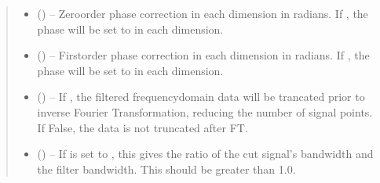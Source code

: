 \documentclass[letterpaper,10pt,english]{sphinxmanual}
\begin{document}
\begin{fulllineitems}
\begin{quote}
\begin{description}
\begin{itemize}
\item {} 
\sphinxAtStartPar
{} (\sphinxstyleliteralemphasis{\sphinxupquote{{[}}}\sphinxstyleliteralemphasis{\sphinxupquote{{]}}}\sphinxstyleliteralemphasis{\sphinxupquote{, }}\sphinxstyleliteralemphasis{\sphinxupquote{{[}}}\sphinxstyleliteralemphasis{\sphinxupquote{, }}\sphinxstyleliteralemphasis{\sphinxupquote{{]}}}) – Zero\sphinxhyphen{}order phase correction in each dimension in radians. If ,
the phase will be set to  in each dimension.

\item {} 
\sphinxAtStartPar
{} (\sphinxstyleliteralemphasis{\sphinxupquote{{[}}}\sphinxstyleliteralemphasis{\sphinxupquote{{]} or }}\sphinxstyleliteralemphasis{\sphinxupquote{{[}}}\sphinxstyleliteralemphasis{\sphinxupquote{, }}\sphinxstyleliteralemphasis{\sphinxupquote{{]}}}\sphinxstyleliteralemphasis{\sphinxupquote{, }}\sphinxstyleliteralemphasis{\sphinxupquote{ {[}}}\sphinxstyleliteralemphasis{\sphinxupquote{, }}\sphinxstyleliteralemphasis{\sphinxupquote{{]}}}) – First\sphinxhyphen{}order phase correction in each dimension in radians. If ,
the phase will be set to  in each dimension.

\item {} 
\sphinxAtStartPar
{} (\sphinxstyleliteralemphasis{\sphinxupquote{, }}) – If , the filtered frequency\sphinxhyphen{}domain data will be trancated
prior to inverse Fourier Transformation, reducing the number
of signal points. If False, the data is not truncated after FT.

\item {} 
\sphinxAtStartPar
{} (\sphinxstyleliteralemphasis{\sphinxupquote{, }}) – If  is set to , this gives the ratio of the cut signal’s
bandwidth and the filter bandwidth. This should be greater than 1.0.


\end{itemize}
\end{description}
\end{quote}
\end{fulllineitems}
\end{document}
